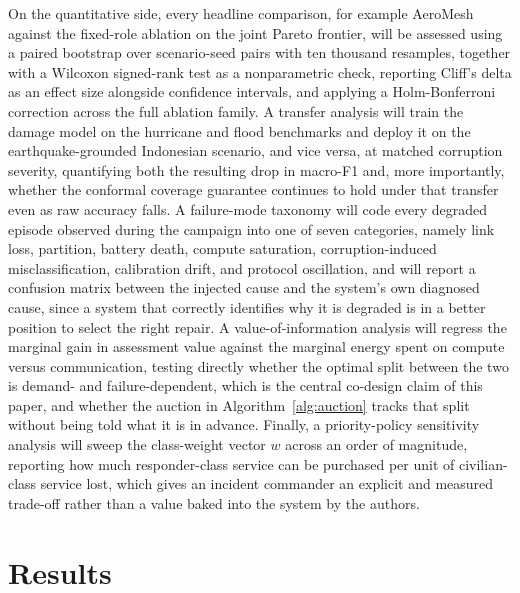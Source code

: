 \documentclass[drones,article,submit,moreauthors]{Definitions/mdpi}
\begin{document}
On the quantitative side, every headline comparison, for example AeroMesh against the fixed-role ablation on the joint Pareto frontier, will be assessed using a paired bootstrap over scenario-seed pairs with ten thousand resamples, together with a Wilcoxon signed-rank test as a nonparametric check, reporting Cliff's delta as an effect size alongside confidence intervals, and applying a Holm-Bonferroni correction across the full ablation family. A transfer analysis will train the damage model on the hurricane and flood benchmarks and deploy it on the earthquake-grounded Indonesian scenario, and vice versa, at matched corruption severity, quantifying both the resulting drop in macro-F1 and, more importantly, whether the conformal coverage guarantee continues to hold under that transfer even as raw accuracy falls. A failure-mode taxonomy will code every degraded episode observed during the campaign into one of seven categories, namely link loss, partition, battery death, compute saturation, corruption-induced misclassification, calibration drift, and protocol oscillation, and will report a confusion matrix between the injected cause and the system's own diagnosed cause, since a system that correctly identifies why it is degraded is in a better position to select the right repair. A value-of-information analysis will regress the marginal gain in assessment value against the marginal energy spent on compute versus communication, testing directly whether the optimal split between the two is demand- and failure-dependent, which is the central co-design claim of this paper, and whether the auction in Algorithm~\ref{alg:auction} tracks that split without being told what it is in advance. Finally, a priority-policy sensitivity analysis will sweep the class-weight vector $w$ across an order of magnitude, reporting how much responder-class service can be purchased per unit of civilian-class service lost, which gives an incident commander an explicit and measured trade-off rather than a value baked into the system by the authors.

\section{Results}
\label{sec:results}
\end{document}
